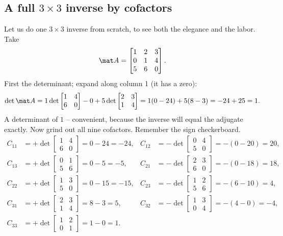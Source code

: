 \subsection{A full \texorpdfstring{$3\times3$}{3x3} inverse by cofactors}

Let us do one $3\times3$ inverse from scratch, to see both the elegance and the labor. Take
\[
\mat A=\begin{bmatrix} 1 & 2 & 3 \\ 0 & 1 & 4 \\ 5 & 6 & 0 \end{bmatrix}.
\]
First the determinant; expand along column 1 (it has a zero):
\[
\det\mat A
= 1\det\begin{bmatrix}1&4\\6&0\end{bmatrix}
- 0
+ 5\det\begin{bmatrix}2&3\\1&4\end{bmatrix}
= 1(0-24) + 5(8-3) = -24 + 25 = 1.
\]
A determinant of $1$ -- convenient, because the inverse will equal the adjugate exactly. Now grind out
all nine cofactors. Remember the sign checkerboard.
\[
\begin{aligned}
C_{11}&=+\det\begin{bmatrix}1&4\\6&0\end{bmatrix}=0-24=-24,
&C_{12}&=-\det\begin{bmatrix}0&4\\5&0\end{bmatrix}=-(0-20)=20,\\[2pt]
C_{13}&=+\det\begin{bmatrix}0&1\\5&6\end{bmatrix}=0-5=-5,
&C_{21}&=-\det\begin{bmatrix}2&3\\6&0\end{bmatrix}=-(0-18)=18,\\[2pt]
C_{22}&=+\det\begin{bmatrix}1&3\\5&0\end{bmatrix}=0-15=-15,
&C_{23}&=-\det\begin{bmatrix}1&2\\5&6\end{bmatrix}=-(6-10)=4,\\[2pt]
C_{31}&=+\det\begin{bmatrix}2&3\\1&4\end{bmatrix}=8-3=5,
&C_{32}&=-\det\begin{bmatrix}1&3\\0&4\end{bmatrix}=-(4-0)=-4,\\[2pt]
C_{33}&=+\det\begin{bmatrix}1&2\\0&1\end{bmatrix}=1-0=1.
\end{aligned}
\]
